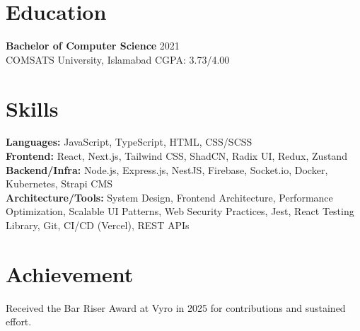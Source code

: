 \documentclass[9pt,letterpaper]{article}
\begin{document}
\section*{Education}
\textbf{Bachelor of Computer Science} \hfill 2021 \\
COMSATS University, Islamabad \hfill CGPA: 3.73/4.00

\section*{Skills}
\textbf{Languages:} JavaScript, TypeScript, HTML, CSS/SCSS \\
\textbf{Frontend:} React, Next.js, Tailwind CSS, ShadCN, Radix UI, Redux, Zustand \\
\textbf{Backend/Infra:} Node.js, Express.js, NestJS, Firebase, Socket.io, Docker, Kubernetes, Strapi CMS \\
\textbf{Architecture/Tools:} System Design, Frontend Architecture, Performance Optimization, Scalable UI Patterns, Web Security Practices, Jest, React Testing Library, Git, CI/CD (Vercel), REST APIs

\section*{Achievement}
Received the Bar Riser Award at Vyro in 2025 for contributions and sustained effort.
\end{document}
